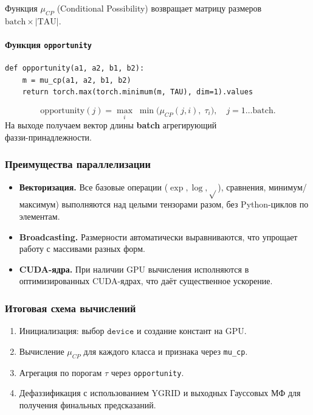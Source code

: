 Функция $\mu_{CP}$ (Conditional Possibility) возвращает матрицу размеров $\text{batch}\times|\mathrm{TAU}|$.

\paragraph{Функция \texttt{opportunity}}

\begin{verbatim}
def opportunity(a1, a2, b1, b2):
    m = mu_cp(a1, a2, b1, b2)
    return torch.max(torch.minimum(m, TAU), dim=1).values
\end{verbatim}

\begin{definition}
\[
  \mathrm{opportunity}(j) 
  = \max_{i}\;\min\bigl(\mu_{CP}(j,i),\;\tau_i\bigr),
  \quad j=1\ldots\text{batch}.
\]
На выходе получаем вектор длины \textbf{batch} агрегирующий \\ фаззи-принадлежности.
\end{definition}

\subsubsection{Преимущества параллелизации}

\begin{itemize}
  \item \textbf{Векторизация.} Все базовые операции ($\exp, \log, \sqrt{}$), сравнения, минимум/максимум) выполняются над целыми тензорами разом, без Python-циклов по элементам.
  \item \textbf{Broadcasting.} Размерности автоматически выравниваются, что упрощает работу с массивами разных форм.
  \item \textbf{CUDA-ядра.} При наличии GPU вычисления исполняются в оптимизированных CUDA-ядрах, что даёт существенное ускорение.
\end{itemize}

\subsubsection{Итоговая схема вычислений}

\begin{enumerate}
  \item Инициализация: выбор \(\texttt{device}\) и создание констант на GPU.
  \item Вычисление \(\mu_{CP}\) для каждого класса и признака через \verb|mu_cp|.
  \item Агрегация по порогам \(\tau\) через \verb|opportunity|.
  \item Дефаззификация с использованием \(\mathrm{YGRID}\) и выходных Гауссовых МФ для получения финальных предсказаний.
\end{enumerate}

